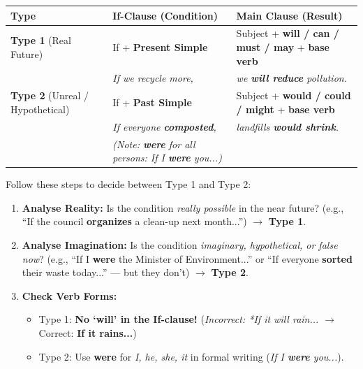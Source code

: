 \documentclass[11pt]{article}
\begin{document}
\begin{propriete}
\begin{center}
\begin{tabularx}{\linewidth}{|l|X|X|}
\hline
\rowcolor{popblueL}
\textbf{Type} & \textbf{If-Clause (Condition)} & \textbf{Main Clause (Result)} \\
\hline
\textbf{Type 1} (Real Future) & If + \textbf{Present Simple} & Subject + \textbf{will / can / must / may} + \textbf{base verb} \\
& \textit{If we recycle more,} & \textit{we \textbf{will reduce} pollution.} \\
\hline
\textbf{Type 2} (Unreal / Hypothetical) & If + \textbf{Past Simple} & Subject + \textbf{would / could / might} + \textbf{base verb} \\
& \textit{If everyone \textbf{composted},} & \textit{landfills \textbf{would shrink}.} \\
& \textit{(Note: \textbf{were} for all persons: If I \textbf{were} you...)} & \\
\hline
\end{tabularx}
\end{center}
\end{propriete}

\begin{methode}
Follow these steps to decide between Type 1 and Type 2:
\begin{enumerate}
    \item \textbf{Analyse Reality:} Is the condition \emph{really possible} in the near future? (e.g., ``If the council \textbf{organizes} a clean-up next month...'') $\rightarrow$ \textbf{Type 1}.
    \item \textbf{Analyse Imagination:} Is the condition \emph{imaginary, hypothetical, or false now}? (e.g., ``If I \textbf{were} the Minister of Environment...'' or ``If everyone \textbf{sorted} their waste today...'' --- but they don't) $\rightarrow$ \textbf{Type 2}.
    \item \textbf{Check Verb Forms:}
    \begin{itemize}
        \item Type 1: \textbf{No `will' in the If-clause!} (\emph{Incorrect: *If it will rain...} $\rightarrow$ Correct: \textbf{If it rains...})
        \item Type 2: Use \textbf{were} for \emph{I, he, she, it} in formal writing (\emph{If I \textbf{were} you...}).
    \end{itemize}
\end{enumerate}
\end{methode}
\end{document}
